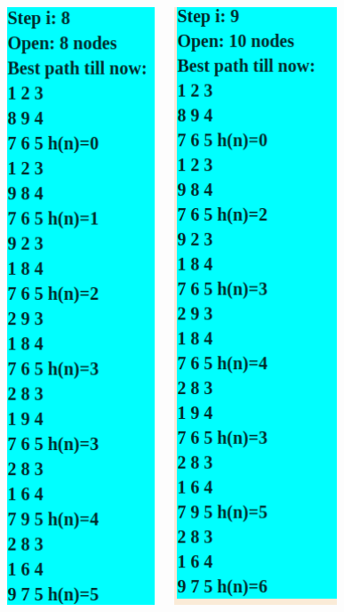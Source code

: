 \begin{figure}
\centering
\includegraphics[width=2in, height=7in]{8h1.png}
\includegraphics[width=2in, height=7in]{9h1.png}

\end{figure}
